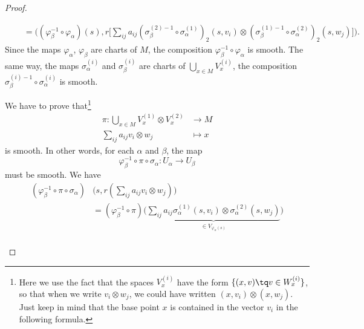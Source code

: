 \begin{proof}
\begin{subproof}
\begin{subproof}
\begin{subproof}
\begin{subequations}
\begin{align}
						 & \quad = \Big( (\varphi_{\beta}^{-1}\circ\varphi_{\alpha})(s),r\big[  \sum_{ij}a_{ij}(\sigma_{\beta}^{(2)-1}\circ\sigma_{\alpha}^{(1)})_2(s,v_i)\otimes (\sigma_{\beta}^{(1)-1}\circ\sigma_{\alpha}^{(2)})_2(s,w_j) \big] \Big).
					\end{align}
				\end{subequations}
				Since the maps \( \varphi_{\alpha}\), \( \varphi_{\beta}\) are charts of \( M\), the composition \( \varphi_{\beta}^{-1}\circ\varphi_{\alpha}\) is smooth. The same way, the maps \( \sigma_{\alpha}^{(i)}\) and \( \sigma_{\beta}^{(i)} \) are charts of \( \bigcup_{x\in M}V_x^{(i)}\), the composition \( \sigma_{\beta}^{(i)-1}\circ \sigma_{\alpha}^(i)\) is smooth.
			\end{subproof}
		\end{subproof}
		We have to prove that\footnote{Here we use the fact that the spaces \( V_x^{(i)}\) have the form \( \{ (x,v)\tq v\in W_x^{(i)} \}\), so that when we write \( v_i\otimes w_j\), we could have written \( (x,v_i)\otimes (x,w_j)\). Just keep in mind that the base point \( x\) is contained in the vector \( v_i\) in the following formula.}
		\begin{equation}
			\begin{aligned}
				\pi\colon \bigcup_{x\in M}V_x^{(1)}\otimes V_x^{(2)} & \to M     \\
				\sum_{ij}a_{ij}v_i\otimes w_j                        & \mapsto x
			\end{aligned}
		\end{equation}
		is smooth. In other words, for each \( \alpha\) and \( \beta\), the map
		\begin{equation}
			\varphi_{\beta}^{-1}\circ \pi\circ \sigma_{\alpha} \colon U_{\alpha}\to U_{\beta}
		\end{equation}
		must be smooth. We have
		\begin{subequations}
			\begin{align}
				(\varphi_{\beta}^{-1}\circ\pi\circ\sigma_{\alpha}) & \big( s,r(\sum_{ij}a_{ij}v_i\otimes w_j) \big)                                                                                                                        \\
				                                                   & =(\varphi_{\beta}^{-1}\circ\pi)\Big( \underbrace{\sum_{ij}a_{ij}\sigma_{\alpha}^{(1)}(s,v_i)\otimes \sigma_{\alpha}^{(2)}(s,w_j)}_{\in V_{\varphi_{\alpha}(s)}} \Big) \\

\end{align}
\end{subequations}
\end{subproof}
\end{proof}
